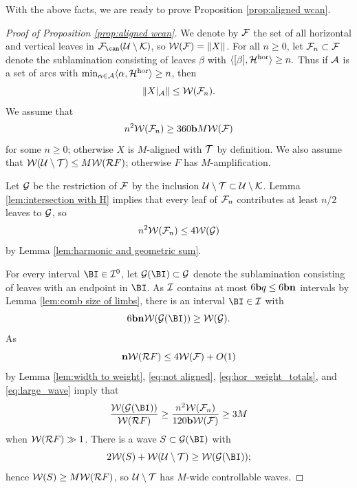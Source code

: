 \documentclass[12pt]{amsart}
\begin{document}
With the above facts, we are ready to prove Proposition \ref{prop:aligned wcan}.
\begin{proof}[Proof of Proposition \ref{prop:aligned wcan}]
	We denote by $\FF$ the set of all horizontal and vertical leaves in $\FF_{\can}(\UU\sm \KK)$, so $\WW(\FF) = \|X\|$. For all $n\geq 0$, let $\FF_n\subset \FF$ denote the sublamination consisting of leaves $\beta$ with  $\langle [\beta],\HH^\hor \rangle\geq n.$ Thus if $\AA$ is a set of arcs with $\min_{\alpha\in \AA}\langle \alpha, \HH^\hor\rangle\geq n$,  then 
	$$\|X|_{\AA}\|\leq \WW(\FF_n).$$
	We assume that \begin{equation}\label{eq:not aligned}
		{n^2\WW(\FF_{n})}\geq  {360 \bound M}{\WW(\FF)}
	\end{equation}
	for some $n\geq 0$; otherwise $X$ is $M$-aligned with $\TT$ by definition. We also assume that $\WW(\UU\sm \TT)\leq M\WW(\RR F)$; otherwise $F$ has $M$-amplification.
	
	
	
	Let $\GG$ be the restriction of $\FF$ by the inclusion $\UU\sm \TT\subset \UU\sm \KK$.
	Lemma \ref{lem:intersection with H} implies that every leaf of $\FF_n$ contributes at least $n/2$ leaves to $\GG$, so
	\begin{equation}\label{eq:hor_weight_totals}
		n^2\WW(\FF_n)\leq 4\WW(\GG)
	\end{equation}
    by Lemma \ref{lem:harmonic and geometric sum}.
	
	For every interval $\BI\in \II^0$, let $\GG(\BI)\subset \GG$ denote the sublamination consisting of leaves with an endpoint in $\BI$. 
	As $\II$ contains at most $6\bound q\leq 6\bound \per$ intervals by Lemma \ref{lem:comb size of limbs},
	there is an interval  $\BI\in \II$ with
	\begin{equation}\label{eq:large_wave}
		6\bound\per\WW({\GG}(\BI))\geq \WW(\GG).
	\end{equation}
	As 
	$$\per\WW(\RR F)\leq 4\WW(\FF)+ O(1)$$
	by Lemma \ref{lem:width to weight}, 
	 \eqref{eq:not aligned}, \eqref{eq:hor_weight_totals}, and \eqref{eq:large_wave} imply that 
	\begin{equation*}
		\frac{\WW({{\GG}}(\BI))}{\WW(\RR F)}\geq \frac{n^2\WW(\FF_{n})}{120\bound\WW(\FF)}\geq 3M
	\end{equation*}
	when $\WW(\RR F)\gg 1$. 
	There is a wave $S\subset \GG(\BI)$ with 
	$$2\WW(S)+ \WW(\UU\sm \TT)\geq \WW(\GG (\BI));$$
	hence $\WW(S)\geq M \WW(\RR F)$, so $\UU\sm \TT$ has $M$-wide controllable waves.
\end{proof}
\end{document}
